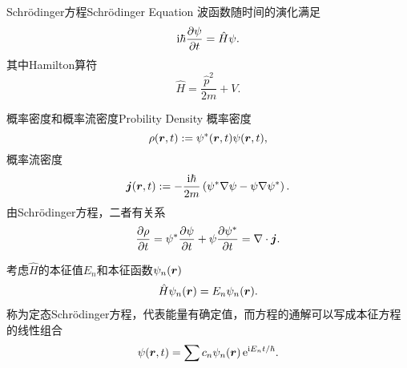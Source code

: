 \begin{theorem}{Schrödinger方程}{Schrödinger Equation}
	波函数随时间的演化满足
	\begin{align}
		\mathrm{i}\hbar\frac{\partial^{\;\!\!}\psi}{\partial t^{\;\!\!}}=\hat H\psi.
	\end{align}
	其中Hamilton算符
	\[
		\hat H=\frac{\hat p^2}{2m}+V.
	\] %
\end{theorem}
\begin{definition}{概率密度和概率流密度}{Probility Density}
	概率密度
	\[
		\rho(\bm r,t):=\psi^*(\bm r,t)\psi(\bm r,t),
	\]
	概率流密度
	\[
		\bm j(\bm r,t):=-\frac{\mathrm{i}\hbar}{2m}\left(\psi^*\nabla\psi-\psi\nabla\psi^*\right).
	\]
	由Schrödinger方程，二者有关系
	\[
		\pv\rho{t}=\psi^*\pv\psi{t}+\psi\pv{\psi^*}t=\nabla\cdot\bm j.
	\]
\end{definition}
考虑$\hat H$的本征值$E_n$和本征函数$\psi_n(\bm r)$
\begin{align}
	\hat H\psi_n(\bm r)=E_n\psi_n(\bm r).
\end{align}
称为定态Schrödinger方程，代表能量有确定值，而方程的通解可以写成本征方程的线性组合
\[
	\psi(\bm r,t)=\sum c_n\psi_n(\bm r)\mathop{}\!\mathrm{e}^{\mathrm{i} E_nt/\hbar}.
\]

\clearpage
